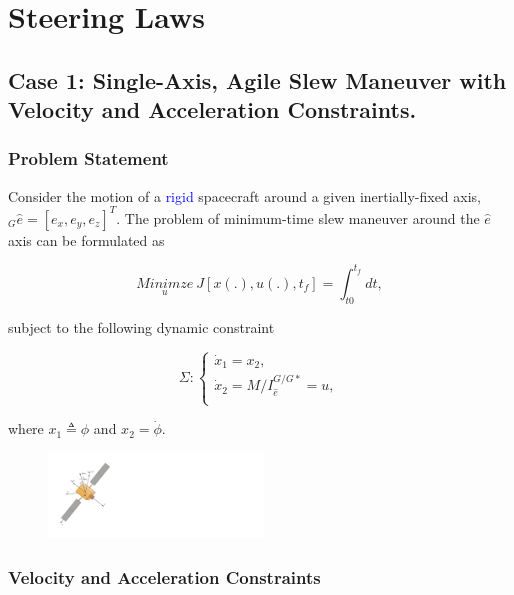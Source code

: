 \documentclass[letterpaper, preprint, paper,11pt]{AAS}	%
\begin{document}
\section{Steering Laws} 

	\subsection{Case 1: Single-Axis, Agile Slew Maneuver with Velocity and Acceleration Constraints.}	 
	
		\subsubsection{Problem Statement}
		
			Consider the motion of a \textcolor{blue}{rigid} spacecraft around a given inertially-fixed axis, $_G\hat{e}=[e_x,e_y,e_z]^T$. The problem of minimum-time slew maneuver around the $\hat{e}$ axis can be formulated as
			
			\begin{equation}\label{costfunction}
				\underset{u}{Minimze}\ J[x(.), u(.), t_f]=\int_{t0}^{t_f} dt,
			\end{equation}
			
			subject to the following dynamic constraint
			
			\begin{equation}\label{system}
				\Sigma:\left\{
				\begin{array}{l}
				\dot{x}_1=x_2, \\
				\dot{x}_2=M/I_{\hat{e}}^{G/G*}=u, \\
				\end{array}
				\right.
			\end{equation}
			
			where $x_1 \triangleq\phi$ and $x_2=\dot{\phi}$. 
			
			\begin{figure}[H]
				\begin{center}
				\includegraphics[width=2.25in]{./Figures/Spacecraft}  
				\end{center}    
			\end{figure}

		\subsubsection{Velocity and Acceleration Constraints}
\end{document}
